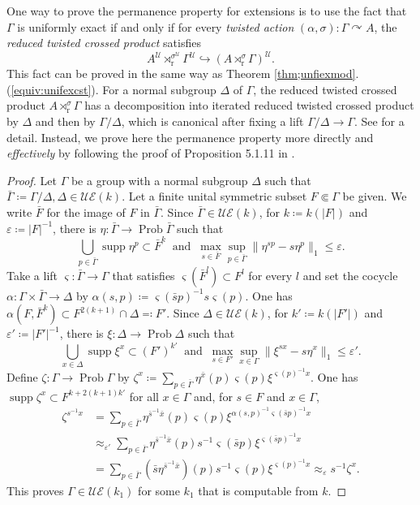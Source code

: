 \documentclass[12pt,nosumlimits,nonamelimits]{amsart}
\theoremstyle{remark}
\theoremstyle{definition}
\newcommand{\rr}{\mathrm{r}}
\newcommand{\cU}{\mathcal{U}}
\newcommand{\ve}{\varepsilon}
\newcommand{\Ga}{\Gamma}
\newcommand{\acts}{\curvearrowright}
\newcommand{\UE}{\mathcal{UE}}
\DeclareMathOperator{\Prob}{Prob}
\DeclareMathOperator{\supp}{supp}
\begin{document}
One way to prove the permanence property for extensions 
is to use the fact that $\Ga$ is uniformly exact if and only if 
for every \emph{twisted action} $(\alpha,\sigma)\colon\Ga\acts A$, 
the \emph{reduced twisted crossed product} satisfies 
\[
A^\cU \rtimes^{\sigma^\cU}_\rr \Ga^\cU
 \hookrightarrow (A \rtimes^\sigma_\rr \Ga)^\cU.
\]
This fact can be proved in the same way as 
Theorem \ref{thm;unfiexmod}.(\ref{equiv:unifexcst}).
For a normal subgroup $\Delta$ of $\Ga$, 
the reduced twisted crossed product 
$A\rtimes^\sigma_\rr \Ga$ has a decomposition 
into iterated reduced twisted crossed product by 
$\Delta$ and then by $\Ga/\Delta$, 
which is canonical after fixing a lift $\Ga/\Delta\to\Ga$. 
See \cite{bedos} for a detail. 
Instead, we prove here the permanence property 
more directly and \emph{effectively} by following the proof 
of Proposition 5.1.11 in \cite{bo}. 
\begin{proof}
Let $\Ga$ be a group with a normal subgroup $\Delta$ 
such that $\bar{\Ga}\coloneq\Ga/\Delta,\Delta\in\UE(k)$. 
Let a finite unital symmetric subset $F\Subset\Ga$ 
be given. 
We write $\bar{F}$ for the image of $F$ in $\bar{\Ga}$. 
Since $\bar{\Ga}\in\UE(k)$, 
for $k \coloneq k(|F|)$ and $\ve \coloneq |F|^{-1}$, 
there is $\eta\colon \bar{\Ga} \to \Prob \bar{\Ga}$ 
such that 
\[
\bigcup_{p \in \bar{\Ga}} \supp \eta^p\subset \bar{F}^k
\ \mbox{ and }\ 
\max_{s\in\bar{F}}\sup_{p\in\bar{\Ga}} 
 \| \eta^{sp} - s\eta^p \|_1\le\ve.
\]
Take a lift $\varsigma\colon\bar{\Ga}\to\Ga$ 
that satisfies $\varsigma(\bar{F}^l) \subset F^l$ for every $l$ 
and set the cocycle 
$\alpha\colon \Ga\times\bar{\Ga} \to \Delta$ by 
$\alpha(s,p)\coloneq\varsigma(\bar{s}p)^{-1}s\varsigma(p)$.
One has $\alpha(F,\bar{F}^k)\subset F^{2(k+1)}\cap\Delta\eqcolon F'$. 
Since $\Delta\in\UE(k)$, 
for $k' \coloneq k(|F'|)$ and $\ve'\coloneq|F'|^{-1}$, 
there is 
$\xi\colon \Delta\to\Prob\Delta$ such that 
\[
\bigcup_{x \in \Delta} \supp \xi^x\subset (F')^{k'}
\ \mbox{ and }\ 
\max_{s\in F'}\sup_{x\in\Ga} 
 \| \xi^{sx} - s\eta^x \|_1\le\ve'.
\]
Define $\zeta\colon \Ga\to\Prob\Ga$ by 
$\zeta^x\coloneq \sum_{p\in\bar{\Ga}}\eta^{\bar{x}}(p)\varsigma(p)\xi^{\varsigma(p)^{-1}x}$.
One has
$\supp\zeta^x\subset F^{k+2(k+1)k'}$ for all $x\in\Ga$ and,  
for $s\in F$ and $x\in\Ga$, 
\begin{align*}
\zeta^{s^{-1}x}
 &= \sum_{p\in\bar{\Ga}}\eta^{\bar{s}^{-1}\bar{x}}(p)
   \varsigma(p)\xi^{\alpha(s,p)^{-1}\varsigma(\bar{s}p)^{-1}x}\\
 &\approx_{\ve'} \sum_{p\in\bar{\Ga}}\eta^{\bar{s}^{-1}\bar{x}}(p)
   s^{-1}\varsigma(\bar{s}p)\xi^{\varsigma(\bar{s}p)^{-1}x}\\
 &= \sum_{p\in\bar{\Ga}}(\bar{s}\eta^{\bar{s}^{-1}\bar{x}})(p)
   s^{-1}\varsigma(p)\xi^{\varsigma(p)^{-1}x}
  \approx_\ve s^{-1}\zeta^x.
\end{align*}
This proves $\Ga\in\UE(k_1)$ for some $k_1$ that is computable from $k$. 
\end{proof}
\end{document}
